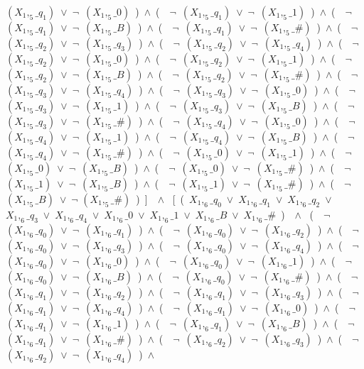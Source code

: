 ﻿\documentclass[a4paper,10pt]{article}
\begin{document}
$(X_1,_5\_q_1)$\ $\vee$\ $\neg$\ $(X_1,_5\_0)$\ )\ $\wedge$\ (\ \ $\neg$\ $(X_1,_5\_q_1)$\ $\vee$\ $\neg$\ $(X_1,_5\_1)$\ )\ $\wedge$\ (\ \ $\neg$\ $(X_1,_5\_q_1)$\ $\vee$\ $\neg$\ $(X_1,_5\_B)$\ )\ $\wedge$\ (\ \ $\neg$\ $(X_1,_5\_q_1)$\ $\vee$\ $\neg$\ $(X_1,_5\_\#)$\ )\ $\wedge$\ (\ \ $\neg$\ $(X_1,_5\_q_2)$\ $\vee$\ $\neg$\ $(X_1,_5\_q_3)$\ )\ $\wedge$\ (\ \ $\neg$\ $(X_1,_5\_q_2)$\ $\vee$\ $\neg$\ $(X_1,_5\_q_4)$\ )\ $\wedge$\ (\ \ $\neg$\ $(X_1,_5\_q_2)$\ $\vee$\ $\neg$\ $(X_1,_5\_0)$\ )\ $\wedge$\ (\ \ $\neg$\ $(X_1,_5\_q_2)$\ $\vee$\ $\neg$\ $(X_1,_5\_1)$\ )\ $\wedge$\ (\ \ $\neg$\ $(X_1,_5\_q_2)$\ $\vee$\ $\neg$\ $(X_1,_5\_B)$\ )\ $\wedge$\ (\ \ $\neg$\ $(X_1,_5\_q_2)$\ $\vee$\ $\neg$\ $(X_1,_5\_\#)$\ )\ $\wedge$\ (\ \ $\neg$\ $(X_1,_5\_q_3)$\ $\vee$\ $\neg$\ $(X_1,_5\_q_4)$\ )\ $\wedge$\ (\ \ $\neg$\ $(X_1,_5\_q_3)$\ $\vee$\ $\neg$\ $(X_1,_5\_0)$\ )\ $\wedge$\ (\ \ $\neg$\ $(X_1,_5\_q_3)$\ $\vee$\ $\neg$\ $(X_1,_5\_1)$\ )\ $\wedge$\ (\ \ $\neg$\ $(X_1,_5\_q_3)$\ $\vee$\ $\neg$\ $(X_1,_5\_B)$\ )\ $\wedge$\ (\ \ $\neg$\ $(X_1,_5\_q_3)$\ $\vee$\ $\neg$\ $(X_1,_5\_\#)$\ )\ $\wedge$\ (\ \ $\neg$\ $(X_1,_5\_q_4)$\ $\vee$\ $\neg$\ $(X_1,_5\_0)$\ )\ $\wedge$\ (\ \ $\neg$\ $(X_1,_5\_q_4)$\ $\vee$\ $\neg$\ $(X_1,_5\_1)$\ )\ $\wedge$\ (\ \ $\neg$\ $(X_1,_5\_q_4)$\ $\vee$\ $\neg$\ $(X_1,_5\_B)$\ )\ $\wedge$\ (\ \ $\neg$\ $(X_1,_5\_q_4)$\ $\vee$\ $\neg$\ $(X_1,_5\_\#)$\ )\ $\wedge$\ (\ \ $\neg$\ $(X_1,_5\_0)$\ $\vee$\ $\neg$\ $(X_1,_5\_1)$\ )\ $\wedge$\ (\ \ $\neg$\ $(X_1,_5\_0)$\ $\vee$\ $\neg$\ $(X_1,_5\_B)$\ )\ $\wedge$\ (\ \ $\neg$\ $(X_1,_5\_0)$\ $\vee$\ $\neg$\ $(X_1,_5\_\#)$\ )\ $\wedge$\ (\ \ $\neg$\ $(X_1,_5\_1)$\ $\vee$\ $\neg$\ $(X_1,_5\_B)$\ )\ $\wedge$\ (\ \ $\neg$\ $(X_1,_5\_1)$\ $\vee$\ $\neg$\ $(X_1,_5\_\#)$\ )\ $\wedge$\ (\ \ $\neg$ $(X_1,_5\_B)$\ $\vee$\ $\neg$ $(X_1,_5\_\#)$\ )\ ]\ \ $\wedge$ \ [\ (\ $X_1,_6\_q_0$\ $\vee$\ $X_1,_6\_q_1$\ $\vee$\ $X_1,_6\_q_2$\ $\vee$\ $X_1,_6\_q_3$\ $\vee$\ $X_1,_6\_q_4$\ $\vee$\ $X_1,_6\_0$\ $\vee$\ $X_1,_6\_1$\ $\vee$\ $X_1,_6\_B$\ $\vee$\ $X_1,_6\_\#$\ )\ \ $\wedge$ \ (\ \ $\neg$\ $(X_1,_6\_q_0)$\ $\vee$\ $\neg$\ $(X_1,_6\_q_1)$\ )\ $\wedge$\ (\ \ $\neg$\ $(X_1,_6\_q_0)$\ $\vee$\ $\neg$\ $(X_1,_6\_q_2)$\ )\ $\wedge$\ (\ \ $\neg$\ $(X_1,_6\_q_0)$\ $\vee$\ $\neg$\ $(X_1,_6\_q_3)$\ )\ $\wedge$\ (\ \ $\neg$\ $(X_1,_6\_q_0)$\ $\vee$\ $\neg$\ $(X_1,_6\_q_4)$\ )\ $\wedge$\ (\ \ $\neg$\ $(X_1,_6\_q_0)$\ $\vee$\ $\neg$\ $(X_1,_6\_0)$\ )\ $\wedge$\ (\ \ $\neg$\ $(X_1,_6\_q_0)$\ $\vee$\ $\neg$\ $(X_1,_6\_1)$\ )\ $\wedge$\ (\ \ $\neg$\ $(X_1,_6\_q_0)$\ $\vee$\ $\neg$\ $(X_1,_6\_B)$\ )\ $\wedge$\ (\ \ $\neg$\ $(X_1,_6\_q_0)$\ $\vee$\ $\neg$\ $(X_1,_6\_\#)$\ )\ $\wedge$\ (\ \ $\neg$\ $(X_1,_6\_q_1)$\ $\vee$\ $\neg$\ $(X_1,_6\_q_2)$\ )\ $\wedge$\ (\ \ $\neg$\ $(X_1,_6\_q_1)$\ $\vee$\ $\neg$\ $(X_1,_6\_q_3)$\ )\ $\wedge$\ (\ \ $\neg$\ $(X_1,_6\_q_1)$\ $\vee$\ $\neg$\ $(X_1,_6\_q_4)$\ )\ $\wedge$\ (\ \ $\neg$\ $(X_1,_6\_q_1)$\ $\vee$\ $\neg$\ $(X_1,_6\_0)$\ )\ $\wedge$\ (\ \ $\neg$\ $(X_1,_6\_q_1)$\ $\vee$\ $\neg$\ $(X_1,_6\_1)$\ )\ $\wedge$\ (\ \ $\neg$\ $(X_1,_6\_q_1)$\ $\vee$\ $\neg$\ $(X_1,_6\_B)$\ )\ $\wedge$\ (\ \ $\neg$\ $(X_1,_6\_q_1)$\ $\vee$\ $\neg$\ $(X_1,_6\_\#)$\ )\ $\wedge$\ (\ \ $\neg$\ $(X_1,_6\_q_2)$\ $\vee$\ $\neg$\ $(X_1,_6\_q_3)$\ )\ $\wedge$\ (\ \ $\neg$\ $(X_1,_6\_q_2)$\ $\vee$\ $\neg$\ $(X_1,_6\_q_4)$\ )\ $\wedge$\ 
\end{document}
